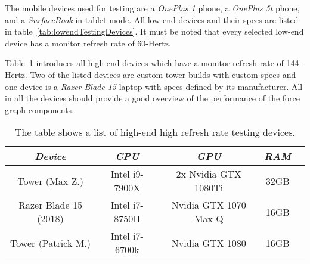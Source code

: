 The mobile devices used for testing are a \emph{OnePlus 1} phone, a \emph{OnePlus 5t} phone, and a \emph{SurfaceBook} in tablet mode. All low-end devices and their specs are listed in table~\ref{tab:lowendTestingDevices}. It must be noted that every selected low-end device has a monitor refresh rate of 60-Hertz. 

Table~\ref{tab:highendTestingDevices} introduces all high-end devices which have a monitor refresh rate of 144-Hertz. Two of the listed devices are custom tower builds with custom specs and one device is a \emph{Razer Blade 15} laptop with specs defined by its manufacturer. All in all the devices should provide a good overview of the performance of the force graph components.

\begin{table}
  \centering
  \begin{threeparttable}
    \caption{The table shows a list of high-end high refresh rate testing devices.}
    \label{tab:highendTestingDevices}
    \centering
    \def\rr{\rightskip=0pt plus1em \spaceskip=.3333em \xspaceskip=.5em\relax}
    \setlength{\tabcolsep}{1ex}
    \def\arraystretch{1.20}
    \setlength{\tabcolsep}{1ex}
    \small
    \begin{english}
      \begin{tabular}{|c||c|c|c|c|}
        \hline
          \multicolumn{1}{|c||}{\emph{Device}}&
          \multicolumn{1}{|c}{\emph{CPU}} &
          \multicolumn{1}{|c}{\emph{GPU}} &
          \multicolumn{1}{|c|}{\emph{RAM}} \\
        \hline
        \hline
        Tower (Max Z.) & 
        Intel i9-7900X & 
        2x Nvidia GTX 1080Ti & 
        32GB \\
        \hline
        Razer Blade 15 (2018) & 
        Intel i7-8750H & 
        Nvidia GTX 1070 Max-Q  & 
        16GB \\
        \hline
        Tower (Patrick M.) &
        Intel i7-6700k & 
        Nvidia GTX 1080 & 
        16GB \\
        \hline
      \end{tabular}  
    \end{english}
  \end{threeparttable}
\end{table}

